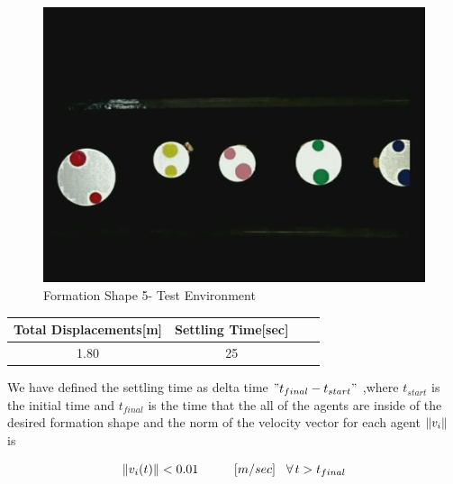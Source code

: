\begin{figure}[H]
\caption{Formation Shape 5- Test Environment}
\centerline{\includegraphics[scale = 0.35]{9_real_hardware}}
\end{figure} 
					
\begin{center}
 \label{hardwareshape5_ref} 
\begin{tabular}{||c| c |c |c ||}
\hline
\textbf{Total Displacements[m]}  & \textbf{Settling Time[sec]}\\ 
\hline
1.80 & 25 \\
\hline
\end{tabular}
\end{center}

We have defined the settling time as delta time $"t_{final} - t_{start}"$ ,where $t_{start}$ is the initial time and $t_{final}$ is the time that the all of the agents are inside of the desired formation shape and the norm of the velocity vector for each agent $\left\lVert v_i\right\rVert$ is

\begin{equation}
\left\lVert v_i(t)\right\rVert < 0.01 \hspace{1.0cm} [m/sec] \hspace{0.3cm}\forall\hspace{0.05cm} t>t_{final}
\end{equation}

